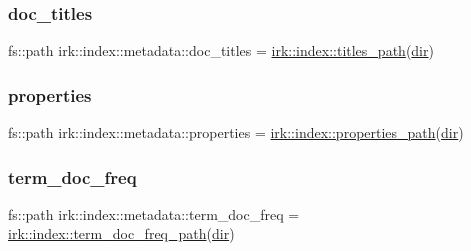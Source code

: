 \mbox{\label{structirk_1_1index_1_1metadata_aae05b9d0a33fd6c90f7f9be0a359ca77}} 
\subsubsection{\texorpdfstring{doc\+\_\+titles}{doc\_titles}}
{\footnotesize\ttfamily fs\+::path irk\+::index\+::metadata\+::doc\+\_\+titles = \mbox{\hyperlink{namespaceirk_1_1index_a199554d3966dc8c076fc6c0c8d141784}{irk\+::index\+::titles\+\_\+path}}(\mbox{\hyperlink{structirk_1_1index_1_1metadata_a355b4325c022cd152e68fc18b1775fc6}{dir}})}

\mbox{\label{structirk_1_1index_1_1metadata_a1501ec5d527da04b74af747230504ee0}} 
\subsubsection{\texorpdfstring{properties}{properties}}
{\footnotesize\ttfamily fs\+::path irk\+::index\+::metadata\+::properties = \mbox{\hyperlink{namespaceirk_1_1index_a1d229aa9c1efde2164015640a052886b}{irk\+::index\+::properties\+\_\+path}}(\mbox{\hyperlink{structirk_1_1index_1_1metadata_a355b4325c022cd152e68fc18b1775fc6}{dir}})}

\mbox{\label{structirk_1_1index_1_1metadata_a620a29ca94ec440938aa5468c96a68fa}} 
\subsubsection{\texorpdfstring{term\+\_\+doc\+\_\+freq}{term\_doc\_freq}}
{\footnotesize\ttfamily fs\+::path irk\+::index\+::metadata\+::term\+\_\+doc\+\_\+freq = \mbox{\hyperlink{namespaceirk_1_1index_a18866e660d3b9982f7f3b9c79dc410c6}{irk\+::index\+::term\+\_\+doc\+\_\+freq\+\_\+path}}(\mbox{\hyperlink{structirk_1_1index_1_1metadata_a355b4325c022cd152e68fc18b1775fc6}{dir}})}

